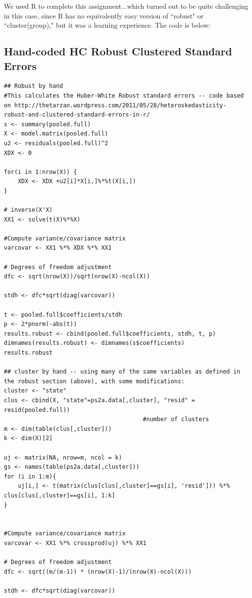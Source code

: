 \documentclass[letterpaper, 12pt]{article}
\begin{document}
We used R to complete this assignment...which turned out to be quite challenging in this case, since R has no equivalently easy version of ``robust" or ``cluster(group)," but it was a learning experience.  The code is below:




\subsection{Hand-coded HC Robust Clustered Standard Errors}

\begin{lstlisting}
## Robust by hand
#This calculates the Huber-White Robust standard errors -- code based on http://thetarzan.wordpress.com/2011/05/28/heteroskedasticity-robust-and-clustered-standard-errors-in-r/
s <- summary(pooled.full)
X <- model.matrix(pooled.full)
u2 <- residuals(pooled.full)^2
XDX <- 0

for(i in 1:nrow(X)) {
    XDX <- XDX +u2[i]*X[i,]%*%t(X[i,])
}

# inverse(X'X)
XX1 <- solve(t(X)%*%X)

#Compute variance/covariance matrix
varcovar <- XX1 %*% XDX %*% XX1

# Degrees of freedom adjustment
dfc <- sqrt(nrow(X))/sqrt(nrow(X)-ncol(X))

stdh <- dfc*sqrt(diag(varcovar))

t <- pooled.full$coefficients/stdh
p <- 2*pnorm(-abs(t))
results.robust <- cbind(pooled.full$coefficients, stdh, t, p)
dimnames(results.robust) <- dimnames(s$coefficients)
results.robust

## cluster by hand -- using many of the same variables as defined in the robust section (above), with some modifications:
cluster <- "state"
clus <- cbind(X, "state"=ps2a.data[,cluster], "resid" = resid(pooled.full))
                                        #number of clusters
m <- dim(table(clus[,cluster]))
k <- dim(X)[2]

uj <- matrix(NA, nrow=m, ncol = k)
gs <- names(table(ps2a.data[,cluster]))
for (i in 1:m){
    uj[i,] <- t(matrix(clus[clus[,cluster]==gs[i], 'resid'])) %*% clus[clus[,cluster]==gs[i], 1:k]
}


#Compute variance/covariance matrix
varcovar <- XX1 %*% crossprod(uj) %*% XX1

# Degrees of freedom adjustment
dfc <- sqrt((m/(m-1)) * (nrow(X)-1)/(nrow(X)-ncol(X)))

stdh <- dfc*sqrt(diag(varcovar))


\end{lstlisting}
\end{document}
